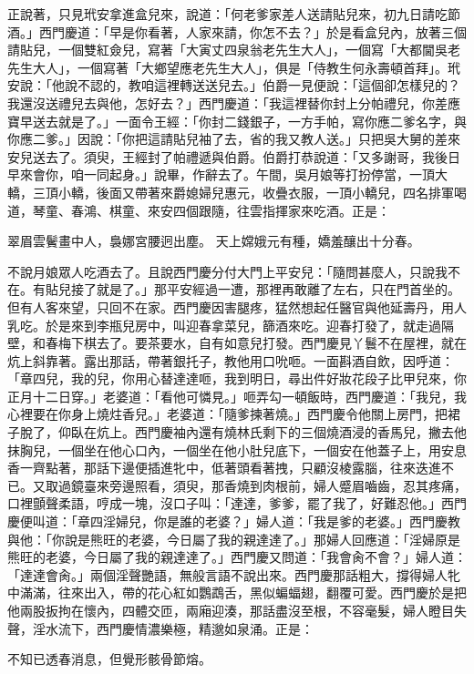 正說著，只見玳安拿進盒兒來，說道：「何老爹家差人送請貼兒來，初九日請吃節酒。」西門慶道：「早是你看著，人家來請，你怎不去？」於是看盒兒內，放著三個請貼兒，一個雙紅僉兒，寫著「大寅丈四泉翁老先生大人」，一個寫「大都閫吳老先生大人」，一個寫著「大鄉望應老先生大人」，俱是「侍教生何永壽頓首拜」。玳安說：「他說不認的，教咱這裡轉送送兒去。」伯爵一見便說：「這個卻怎樣兒的？我還沒送禮兒去與他，怎好去？」西門慶道：「我這裡替你封上分帕禮兒，你差應寶早送去就是了。」一面令王經：「你封二錢銀子，一方手帕，寫你應二爹名字，與你應二爹。」因說：「你把這請貼兒袖了去，省的我又教人送。」只把吳大舅的差來安兒送去了。須臾，王經封了帕禮遞與伯爵。伯爵打恭說道：「又多謝哥，我後日早來會你，咱一同起身。」說畢，作辭去了。午間，吳月娘等打扮停當，一頂大轎，三頂小轎，後面又帶著來爵媳婦兒惠元，收疊衣服，一頂小轎兒，四名排軍喝道，琴童、春鴻、棋童、來安四個跟隨，往雲指揮家來吃酒。正是：

翠眉雲鬢畫中人，裊娜宮腰迥出塵。
天上嫦娥元有種，嬌羞釀出十分春。

不說月娘眾人吃酒去了。且說西門慶分付大門上平安兒：「隨問甚麼人，只說我不在。有貼兒接了就是了。」那平安經過一遭，那裡再敢離了左右，只在門首坐的。但有人客來望，只回不在家。西門慶因害腿疼，猛然想起任醫官與他延壽丹，用人乳吃。於是來到李瓶兒房中，叫迎春拿菜兒，篩酒來吃。迎春打發了，就走過隔壁，和春梅下棋去了。要茶要水，自有如意兒打發。西門慶見丫鬟不在屋裡，就在炕上斜靠著。露出那話，帶著銀托子，教他用口吮咂。一面斟酒自飲，因呼道： 「章四兒，我的兒，你用心替達達咂，我到明日，尋出件好妝花段子比甲兒來，你正月十二日穿。」老婆道：「看他可憐見。」咂弄勾一頓飯時，西門慶道：「我兒，我心裡要在你身上燒炷香兒。」老婆道：「隨爹揀著燒。」西門慶令他關上房門，把裙子脫了，仰臥在炕上。西門慶袖內還有燒林氏剩下的三個燒酒浸的香馬兒，撇去他抹胸兒，一個坐在他心口內，一個坐在他小肚兒底下，一個安在他蓋子上，用安息香一齊點著，那話下邊便插進牝中，低著頭看著拽，只顧沒棱露腦，往來迭進不已。又取過鏡臺來旁邊照看，須臾，那香燒到肉根前，婦人蹙眉嚙齒，忍其疼痛，口裡顫聲柔語，哼成一塊，沒口子叫：「達達，爹爹，罷了我了，好難忍他。」西門慶便叫道：「章四淫婦兒，你是誰的老婆？」婦人道：「我是爹的老婆。」西門慶教與他：「你說是熊旺的老婆，今日屬了我的親達達了。」那婦人回應道：「淫婦原是熊旺的老婆，今日屬了我的親達達了。」西門慶又問道：「我會肏不會？」婦人道：「達達會肏。」兩個淫聲艷語，無般言語不說出來。西門慶那話粗大，撐得婦人牝中滿滿，往來出入，帶的花心紅如鸚鵡舌，黑似蝙蝠翅，翻覆可愛。西門慶於是把他兩股扳拘在懷內，四體交匝，兩廂迎湊，那話盡沒至根，不容毫髮，婦人瞪目失聲，淫水流下，西門慶情濃樂極，精邈如泉涌。正是：

不知已透春消息，但覺形骸骨節熔。

